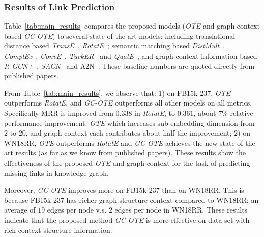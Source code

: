 \documentclass[11pt,a4paper]{article}
\begin{document}
\subsubsection{Results of Link Prediction}

Table~\ref{tab:main_results} compares the proposed models (\textit{OTE} and graph context based \textit{GC-OTE}) to several state-of-the-art models: including translational distance based {\textit{TransE}}~\cite{bordes2013translating}, {\textit{RotatE}}~\cite{Sun2019RotatEKG}; semantic matching based {\textit{DistMult}}~\cite{yang2014distmult}, {\textit{ComplEx}}~\cite{trouillon2016complex}, {\textit{ConvE}}~\cite{dettmers2017conve}, {\textit{TuckER}}~\cite{balazevic-etal-2019-tucker} and {\textit{QuatE}}~\cite{zhang2019quaternion}, and graph context information based {\textit{R-GCN+}}~\cite{Schlichtkrull2017ModelingRD}, {\textit{SACN}}~\cite{Shang2019EndtoEndSC} and {A2N}~\cite{Bansal2019A2NAT}. These baseline numbers are quoted directly from published papers.

From Table~\ref{tab:main_results}, we observe that: 1) on FB15k-237, {\it OTE} outperforms {\it RotatE}, and {\textit{GC-OTE}} outperforms all other models on all metrics.
Specifically MRR is improved from $0.338$ in {\textit{RotatE}}, to $0.361$, about $7$\% relative performance improvement. {\it OTE} which increases sub-embedding dimension from $2$ to $20$, and graph context each contributes about half the improvement; 2) on WN18RR, {\it OTE} outperforms {\it RotatE} and {\textit{GC-OTE}} achieves the new state-of-the-art results (as far as we know from published papers). 
These results show the effectiveness of the proposed {\it OTE} and graph context for the task of predicting missing links in knowledge graph.

Moreover, {\textit{GC-OTE}} improves more on FB15k-237 than on WN18RR. This is because FB15k-237 has richer graph structure context compared to WN18RR: an average of $19$ edges per node v.s. $2$ edges per node in WN18RR. These results indicate that the proposed method {\it GC-OTE} is more effective on data set with rich context structure information. 
\end{document}
